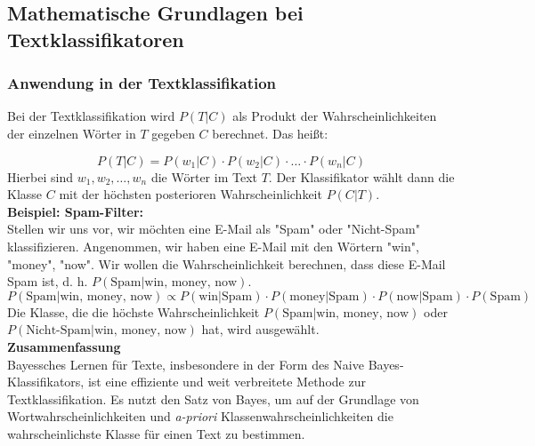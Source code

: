 \documentclass[12pt]{article}
\begin{document}
\subsection{Mathematische Grundlagen bei Textklassifikatoren}

\subsubsection{Anwendung in der Textklassifikation}
%
Bei der Textklassifikation wird \( P(T|C) \) als Produkt der Wahrscheinlichkeiten der einzelnen Wörter in \( T \) gegeben \( C \) berechnet. Das heißt:

\[
P(T|C) = P(w_1|C) \cdot P(w_2|C) \cdot \ldots \cdot P(w_n|C)
\]
%
Hierbei sind \( w_1, w_2, \ldots, w_n \) die Wörter im Text \( T \). Der Klassifikator wählt dann die Klasse \( C \) mit der höchsten posterioren Wahrscheinlichkeit \( P(C|T) \).\\[0.2cm]
%
\textbf{Beispiel: Spam-Filter:}\\
Stellen wir uns vor, wir möchten eine E-Mail als "Spam" oder "Nicht-Spam" klassifizieren. Angenommen, wir haben eine E-Mail mit den Wörtern "win", "money", "now". Wir wollen die Wahrscheinlichkeit berechnen, dass diese E-Mail Spam ist, d. h. \( P(\text{Spam}|\text{win, money, now}) \).
\[
P(\text{Spam}|\text{win, money, now}) \propto P(\text{win}|\text{Spam}) \cdot P(\text{money}|\text{Spam}) \cdot P(\text{now}|\text{Spam}) \cdot P(\text{Spam})
\]
%
Die Klasse, die die höchste Wahrscheinlichkeit \( P(\text{Spam}|\text{win, money, now}) \) oder\\ \( P(\text{Nicht-Spam}|\text{win, money, now}) \) hat, wird ausgewählt.\\[0.2cm]
%
\textbf{Zusammenfassung}\\
Bayessches Lernen für Texte, insbesondere in der Form des Naive Bayes-Klassifikators, ist eine effiziente und weit verbreitete Methode zur Textklassifikation. Es nutzt den Satz von Bayes, um auf der Grundlage von Wortwahrscheinlichkeiten und \textit{a-priori} Klassenwahrscheinlichkeiten die wahrscheinlichste Klasse für einen Text zu bestimmen.  
\end{document}
